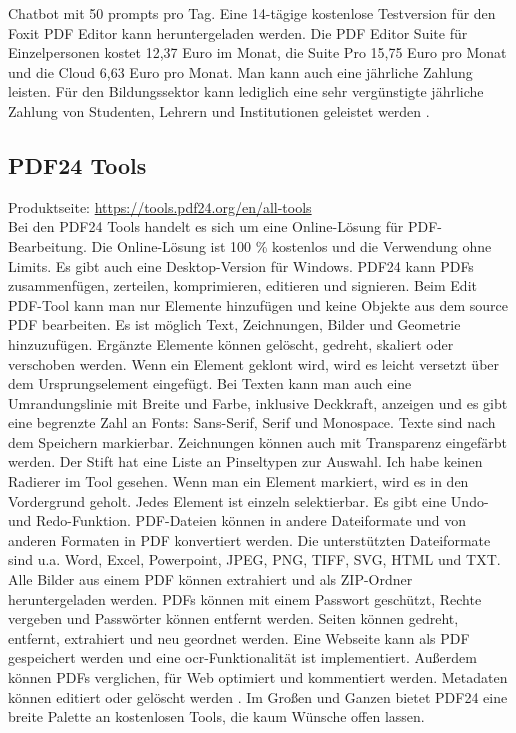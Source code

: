 Chatbot mit 50 prompts pro Tag. Eine 14-tägige kostenlose Testversion für den Foxit PDF Editor kann heruntergeladen werden. Die PDF Editor Suite für Einzelpersonen kostet 12,37 Euro im Monat, die Suite Pro 15,75 Euro pro Monat und die Cloud 6,63 Euro pro Monat. Man kann auch eine jährliche Zahlung leisten. Für den Bildungssektor kann lediglich eine sehr vergünstigte jährliche Zahlung von Studenten, Lehrern und Institutionen geleistet werden \cite{foxit-um}. 

\subsection{PDF24 Tools}
Produktseite: \url{https://tools.pdf24.org/en/all-tools} \\
Bei den PDF24 Tools handelt es sich um eine Online-Lösung für PDF-Bearbeitung. Die Online-Lösung ist 100 \% kostenlos und die Verwendung ohne Limits. Es gibt auch eine Desktop-Version für Windows. PDF24 kann PDFs zusammenfügen, zerteilen, komprimieren, editieren und signieren. Beim Edit PDF-Tool kann man nur Elemente hinzufügen und keine Objekte aus dem source PDF bearbeiten. Es ist möglich Text, Zeichnungen, Bilder und Geometrie hinzuzufügen. Ergänzte Elemente können gelöscht, gedreht, skaliert oder verschoben werden. Wenn ein Element geklont wird, wird es leicht versetzt über dem Ursprungselement eingefügt. Bei Texten kann man auch eine Umrandungslinie mit Breite und Farbe, inklusive Deckkraft, anzeigen und es gibt eine begrenzte Zahl an Fonts: Sans-Serif, Serif und Monospace. Texte sind nach dem Speichern markierbar. Zeichnungen können auch mit Transparenz eingefärbt werden. Der Stift hat eine Liste an Pinseltypen zur Auswahl. Ich habe keinen Radierer im Tool gesehen. Wenn man ein Element markiert, wird es in den Vordergrund geholt. Jedes Element ist einzeln selektierbar. Es gibt eine Undo- und Redo-Funktion. PDF-Dateien können in andere Dateiformate und von anderen Formaten in PDF konvertiert werden. Die unterstützten Dateiformate sind u.a. Word, Excel, Powerpoint, JPEG, PNG, TIFF, SVG, HTML und TXT. Alle Bilder aus einem PDF können extrahiert und als ZIP-Ordner heruntergeladen werden. PDFs können mit einem Passwort geschützt, Rechte vergeben und Passwörter können entfernt werden. Seiten können gedreht, entfernt, extrahiert und neu geordnet werden. Eine Webseite kann als PDF gespeichert werden und eine \gls{ocr}-Funktionalität ist implementiert. Außerdem können PDFs verglichen, für Web optimiert und kommentiert werden. Metadaten können editiert oder gelöscht werden \cite{pdf24}. Im Großen und Ganzen bietet PDF24 eine breite Palette an kostenlosen Tools, die kaum Wünsche offen lassen.

